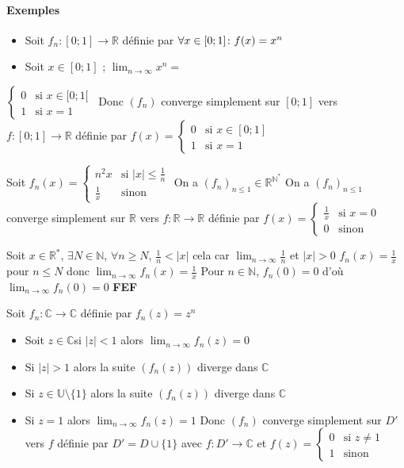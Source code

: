 \documentclass[11pt,hidelinks]{book}
\theoremstyle{mytheoremstyle}
\theoremstyle{mytheoremstyle}
\theoremstyle{mytheoremstyle}
\theoremstyle{mytheoremstyle}
\theoremstyle{mytheoremstyle}
\theoremstyle{mytheoremstyle}
\theoremstyle{mytheoremstyle}
\theoremstyle{mytheoremstyle}
\theoremstyle{myproblemstyle}
\def\mbb#1{\mathbb{#1}}
\def\bN{\mbb{N}}
\def\bC{\mbb{C}}
\def\bR{\mbb{R}}
\def\z{$z \in \bC$}
\def\ln{\lim_{n \to \infty}}
\newcommand{\func}[3]{#1\colon#2\to#3}
\newcommand{\cvs}[2]{converge simplement sur $#1$ vers $#2$}
\newcommand{\de}[4]{\begin{cases}
    #1 & \text{si } #2 \\
    #3 & \text{si } #4
\end{cases}}
\newcommand{\deq}[3]{\begin{cases}
    #1 & \text{si } #2 \\
    #3 & \text{sinon}
\end{cases}}
\begin{document}
    \paragraph*{Exemples}
    \begin{adjustwidth}{-2em}{-1em}
    \begin{ex}
    \begin{itemize}[label=$\cdot$]
    \item Soit $\func{f_n}{[0;1]}{\bR}$ définie par $\forall x \in [0;1]  \colon \space f(x) = x^n$
    \item Soit $x \in [0;1]$ ; $\lim_{n \to \infty} x^n =$ 
    \end{itemize}
    $\begin{cases}
        0 & \text{si } x \in [0;1[ \\
        1 & \text{si } x=1
    \end{cases}$\
    Donc $(f_n)$ \cvs{[0;1]}{\func{f}{[0;1]}{\bR}} définie
    par $f(x) = \de{0}{x \in [0;1]}{1}{x=1}$
\end{ex}
\end{adjustwidth}
    \begin{adjustwidth}{-2em}{-1em}
    \begin{ex}
     Soit $f_n(x) = \deq{n^2x}{|x| \leq \frac{1}{n}}{\frac{1}{x}}$
     On a $(f_n)_{n \leq 1} \in \bR^{\bN^{*}}$ 
    On a $(f_n)_{n \leq 1}$ \cvs{\bR}{\func{f}{\bR}{\bR}} 
    définie par $f(x) = \deq{\frac{1}{x}}{x=0}{0}$
    \begin{ef}
        Soit $x \in \bR^{*}$, $\exists N \in \bN$, $\forall n \geq N$, $\frac{1}{n} < |x|$ cela car
        $\lim_{n \to \infty} \frac{1}{n}$ et $|x| > 0$ 
        $f_n(x) = \frac{1}{x}$ pour $n \leq N$ donc $\ln f_n(x) = \frac{1}{x}$
        Pour $n \in \bN$, $f_n(0) = 0$ d'où $\ln f_n(0) = 0$
        \textbf{FEF}
    \end{ef}
\end{ex}
\end{adjustwidth}
\begin{adjustwidth}{-2em}{-1em}
\begin{ex}
    Soit $\func{f_n}{\bC}{\bC}$ définie par $f_n(z) = z^n$
    
    
    \begin{itemize}[label=$\circ$]
    \item Soit \z si $|z| < 1$ alors $\ln f_n(z) = 0$
    \item Si $|z| > 1$ alors la suite $(f_n(z))$ diverge dans $\bC$
    \item Si $z \in \mbb{U} \setminus \{1\}$ alors la suite $(f_n(z))$ diverge dans $\bC$
    \item Si $z=1$ alors $\ln f_n(z) = 1$
    Donc $(f_n)$ \cvs{D'}{f} définie par $D' = D \cup \{1\}$ avec $\func{f}{D'}{\bC}$ et
    $f(z) = \deq{0}{z \not= 1}{1}$
    \end{itemize}
\end{ex}
\end{adjustwidth}
\end{document}
